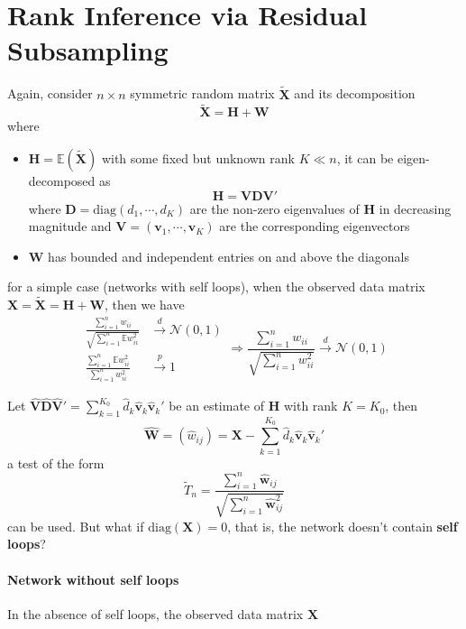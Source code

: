 \documentclass[twoside]{article}
\begin{document}
\section{Rank Inference via Residual Subsampling}
Again, consider $n\times n$ symmetric random matrix $\tilde{\mathbf{X}}$ and its decomposition 
\begin{equation*}
    \tilde{\mathbf{X}} = \mathbf{H+W}
\end{equation*}
where
\begin{itemize}
    \item $\mathbf{H} = \mathbb{E}\left(\tilde{\mathbf{X}}\right)$ with some fixed but unknown rank $K \ll n$, it can be eigen-decomposed as $$ \mathbf{H} = \mathbf{VDV}' $$ where $\mathbf{D} = \mathrm{diag}(d_1,\cdots,d_K)$ are the non-zero eigenvalues of $\mathbf{H}$ in decreasing magnitude and $\mathbf{V}= \left(\mathbf{v}_1,\cdots,\mathbf{v}_K\right)$ are the corresponding eigenvectors
    \item $\mathbf{W}$ has bounded and independent entries on and above the diagonals
\end{itemize}

for a simple case (networks with self loops), when the observed data matrix $\mathbf{X} = \tilde{\mathbf{X}} = \mathbf{H+W}$, then we have 
\begin{equation*}
    \begin{aligned}
        \frac{\sum^n_{i=1}w_{ii}}{\sqrt{\sum^n_{i=1}\mathbb{E}w_{ii}^2}}&\xrightarrow{d}\mathcal{N}(0,1) \\
        \frac{\sum^n_{i=1}\mathbb{E}w_{ii}^2}{\sum^n_{i=1}w^2_{ii}} &\xrightarrow{p} 1
    \end{aligned} \Rightarrow \frac{\sum^n_{i=1}w_{ii}}{\sqrt{\sum^n_{i=1}w_{ii}^2}}\xrightarrow{d}\mathcal{N}(0,1)
\end{equation*}

Let $\hat{\mathbf{V}}\hat{\mathbf{D}}\hat{\mathbf{V}}' = \sum^{K_0}_{k=1}\hat{d}_k \hat{\mathbf{v}}_k \hat{\mathbf{v}}_k'$ be an estimate of $\mathbf{H}$ with rank $K=K_0$, then 
\begin{equation*}
    \hat{\mathbf{W}} = \left(\hat{w}_{ij}\right) = \mathbf{X} - \sum^{K_0}_{k=1}\hat{d}_k \hat{\mathbf{v}}_k \hat{\mathbf{v}}_k'
\end{equation*}
a test of the form 
$$
\tilde{T}_n = \frac{\sum^n_{i=1}\hat{\mathbf{w}}_{ij}}{\sqrt{\sum^n_{i=1}\hat{\mathbf{w}}_{ij}^2}}
$$
can be used. But what if $\mathrm{diag}(\mathbf{X})=0$, that is, the network doesn't contain \textbf{self loops}?

\paragraph*{Network without self loops} In the absence of self loops, the observed data matrix $\mathbf{X}$

\newpage


\end{document}
